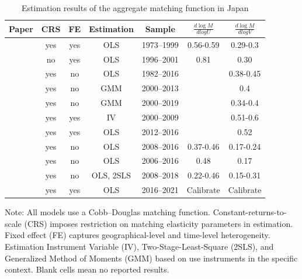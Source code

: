\documentclass[12pt]{article}
\begin{document}
\begin{table}[!htbp]
  \begin{center}
      \caption{Estimation results of the aggregate matching function in Japan}
      \begin{tabular}{|lcccccc|} \hline
   Paper &  CRS & FE & Estimation & Sample & $\frac{d \log M}{d log U}$ & $\frac{d \log M}{d log V}$\\ 
   \hline
   \cite{kano2005estimating} &  yes & yes & OLS & 1973--1999 & 0.56-0.59& 0.29-0.3\\ 
\cite{kambayashi2006vacancy} &  no & yes & OLS & 1996--2001 & 0.81& 0.30\\ 
\cite{sasaki2008matching} &  yes & no & OLS & 1982--2016 & & 0.38-0.45\\ 
\cite{shibata2013labor} &  yes & no & GMM & 2000--2013 & & 0.4\\ 
   \cite{shibata2020labor} &  yes & no & GMM & 2000--2019 & & 0.34-0.4\\ 
\cite{kawata2016multi} &  yes & yes & IV & 2000--2009 & & 0.51-0.6\\ 
\cite{kawata2019} &  yes & yes & OLS & 2012--2016 & & 0.52\\ 
\cite{higashi2018spatial} &  yes & no & OLS & 2008--2016 & 0.37-0.46& 0.17-0.24\\ 
\cite{higashi2020effects} &  yes & no & OLS & 2006--2016 & 0.48& 0.17\\ 
\cite{higashi2021agglomeration} &  yes & no & OLS, 2SLS & 2008--2018 & 0.22-0.46& 0.15-0.31\\ 
\cite{higashi2023did} &  yes & yes & OLS & 2016--2021& Calibrate & Calibrate \\ 
   \hline
 \end{tabular}
 \label{tb:previous_literature} 
  \end{center}
  \footnotesize
  Note: All models use a Cobb–Douglas matching function. Constant-returns-to-scale (CRS) imposes restriction on matching elasticity parameters in estimation. Fixed effect (FE) captures geographical-level and time-level heterogeneity. Estimation Instrument Variable (IV), Two-Stage-Least-Square (2SLS), and Generalized Method of Moments (GMM) based on \cite{borowczyk2013accounting} use instruments in the specific context. Blank cells mean no reported results.
\end{table} 
\end{document}
